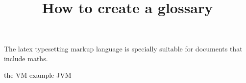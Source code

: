\documentclass{article}
\title{How to create a glossary}
\author{ }
\date{ }
\begin{document}
\maketitle
 
The \Gls{latex} typesetting markup language is specially suitable 
for documents that include \gls{maths}. 

the \Gls{VM} example \gls{JVM}
 
\clearpage
 
\printglossaries
 
\end{document}
